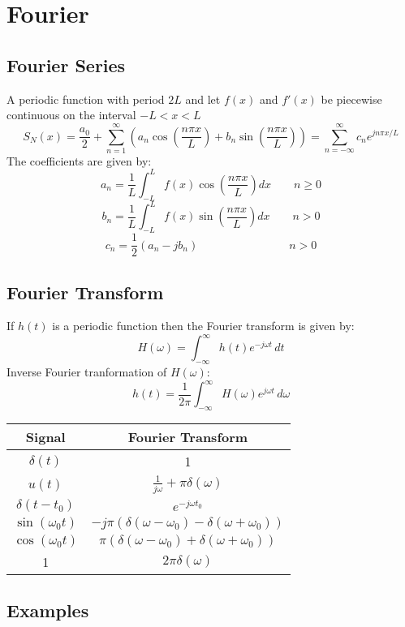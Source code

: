 \section{Fourier}
\subsection{Fourier Series}
A periodic function with period $2L$ and let $f(x)$ and $f'(x)$ be piecewise continuous on the interval $-L < x < L$
$$S_{N}(x)=\frac{a_{0}}{2}+\sum_{n=1}^{\infty}\left( a_{n}\cos\left( \frac{n\pi x}{L} \right)+b_{n}\sin\left( \frac{n\pi x}{L} \right) \right)=\sum^{\infty}_{n=-\infty}c_{n}e^{ jn\pi x/L }$$
The coefficients are given by:
$$a_n  =\frac{1}{L} \int_{-L}^L f(x) \cos \left(\frac{n \pi x}{L}\right) d x\qquad   n \geq 0$$
$$b_n  =\frac{1}{L} \int_{-L}^L f(x) \sin \left(\frac{n \pi x}{L}\right) d x\qquad   n>0$$
$$c_{n}=\frac{1}{2}(a_{n}-jb_{n})\qquad \qquad \qquad\qquad n>0$$

\subsection{Fourier Transform}
If $h(t)$ is a periodic function then the Fourier transform is given by:
$$H(\omega)=\int_{-\infty}^{\infty}h(t)e^{ -j\omega t }  \, dt $$
Inverse Fourier tranformation of $H(\omega)$:
$$h(t)=\frac{1}{2\pi}\int_{-\infty}^{\infty} H(\omega)e^{ j\omega t } \, d\omega $$


\begin{table}[h]
\centering
\begin{tabular}{|c|c|}
\hline
\cellcolor[HTML]{C0C0C0} \textbf{Signal}& \cellcolor[HTML]{C0C0C0}\textbf{Fourier Transform}  \\ \hline
$\delta(t)$& 1\\ \hline
$u(t)$& $\frac{1}{j\omega}+\pi\delta(\omega)$ \\ \hline
$\delta(t-t_0)$& $e^{-j\omega t_0}$  \\ \hline
$\sin(\omega_0t)$&$-j\pi(\delta(\omega-\omega_{0})-\delta(\omega+\omega_{0}))$ \\ \hline
$\cos(\omega_0t)$&$\pi(\delta(\omega-\omega_{0})+\delta(\omega+\omega_{0}))$ \\ \hline
1&$2\pi\delta(\omega)$ \\ \hline
\end{tabular}
\end{table}

\subsection{Examples}
